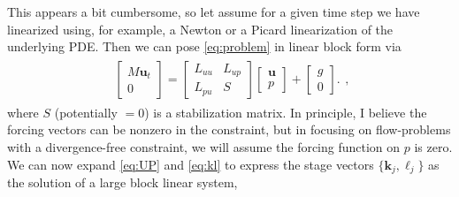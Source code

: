 \documentclass[a4paper,10pt]{article}
\begin{document}
This appears a bit cumbersome, so let assume for a given time step we have
linearized using, for example, a Newton or a Picard linearization of the
underlying PDE. Then we can pose \eqref{eq:problem} in linear block form
via
%
\begin{align}\label{eq:problem2}
\begin{split}
\begin{bmatrix} M \mathbf{u}_t \\ 0 \end{bmatrix}
	= \begin{bmatrix} L_{uu} & L_{up} \\ L_{pu} & S \end{bmatrix}
	\begin{bmatrix} \mathbf{u} \\ p \end{bmatrix} + 
	\begin{bmatrix} g \\ 0 \end{bmatrix}.
\end{split},
\end{align}
%
where $S$ (potentially $= 0$) is a stabilization matrix.
In principle, I believe the forcing vectors can be nonzero in the constraint,
but in focusing on flow-problems with a divergence-free
constraint, we will assume the forcing function on $p$ is zero. We can
now expand \eqref{eq:UP} and \eqref{eq:kl} to express the stage vectors
$\{\mathbf{k}_j, \ell_j\}$ as the solution of a large block linear system,
%
\end{document}
